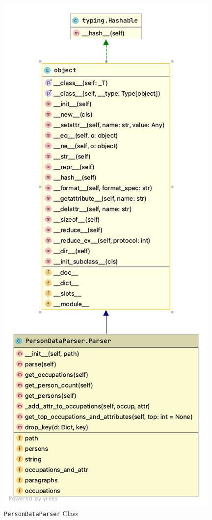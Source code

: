 \documentclass{mefsdp}
\begin{document}
\begin{appendix}
		
		\begin{figure}[h!]
			\centering
			\includegraphics[scale=.55]{UML_diagrams/PersonDataParser.png}
			\caption{\texttt{PersonDataParser} Class\label{fig:dataset_persondataparser}}
		\end{figure}
		
	\end{appendix}
	
	
	
	
\end{document}

